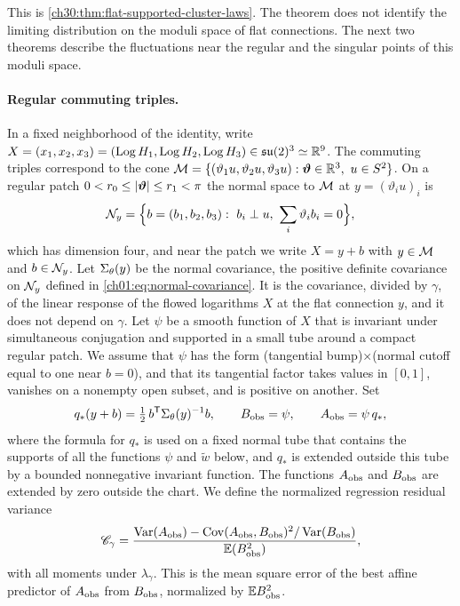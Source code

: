 This is \cref{ch30:thm:flat-supported-cluster-laws}. The theorem does not identify the limiting distribution on the moduli space of flat connections. The next two theorems describe the fluctuations near the regular and the singular points of this moduli space.

\paragraph{Regular commuting triples.}
In a fixed neighborhood of the identity, write $X=(x_1,x_2,x_3)=(\operatorname{Log} H_1,\operatorname{Log} H_2,\operatorname{Log} H_3)\in\mathfrak{su}(2)^3\simeq\mathbb R^9$. The commuting triples correspond to the cone $\CommMan=\{(\vartheta_1u,\vartheta_2u,\vartheta_3u):\bm\vartheta\in\R^3,\ u\in S^2\}$. On a regular patch $0<r_0\le\lvert \bm\vartheta\rvert\le r_1<\pi$ the normal space to $\mathcal M$ at $y=(\vartheta_iu)_i$ is
\[
 \NormalFiber y=\Bigl\{b=(b_1,b_2,b_3):\ b_i\perp u,\ \sum_i\vartheta_ib_i=0\Bigr\},
\]
which has dimension four, and near the patch we write $X=y+b$ with $y\in\mathcal M$ and $b\in\mathcal N_{y}$. Let $\Sigma_\theta(y)$ be the normal covariance, the positive definite covariance on $\mathcal N_{y}$ defined in \eqref{ch01:eq:normal-covariance}. It is the covariance, divided by $\gamma$, of the linear response of the flowed logarithms $X$ at the flat connection $y$, and it does not depend on $\gamma$. Let $\psi$ be a smooth function of $X$ that is invariant under simultaneous conjugation and supported in a small tube around a compact regular patch. We assume that $\psi$ has the form (tangential bump)$\times$(normal cutoff equal to one near $b=0$), and that its tangential factor takes values in $[0,1]$, vanishes on a nonempty open subset, and is positive on another. Set
\[
 q_*(y+b)=\tfrac12\,b^{\mathsf T}\Sigma_\theta(y)^{-1}b,\qquad B_{\mathrm{obs}}=\psi,\qquad A_{\mathrm{obs}}=\psi\,q_*,
\]
where the formula for $q_*$ is used on a fixed normal tube that contains the supports of all the functions $\psi$ and $\widetilde w$ below, and $q_*$ is extended outside this tube by a bounded nonnegative invariant function. The functions $A_{\mathrm{obs}}$ and $B_{\mathrm{obs}}$ are extended by zero outside the chart. We define the normalized regression residual variance
\[
 \mathscr C_\gamma=\frac{\operatorname{Var}(A_{\mathrm{obs}})-\operatorname{Cov}(A_{\mathrm{obs}},B_{\mathrm{obs}})^2/\operatorname{Var}(B_{\mathrm{obs}})}{\mathbb E(B_{\mathrm{obs}}^2)},
\]
with all moments under $\lambda_\gamma$. This is the mean square error of the best affine predictor of $A_{\mathrm{obs}}$ from $B_{\mathrm{obs}}$, normalized by $\mathbb EB_{\mathrm{obs}}^2$.

